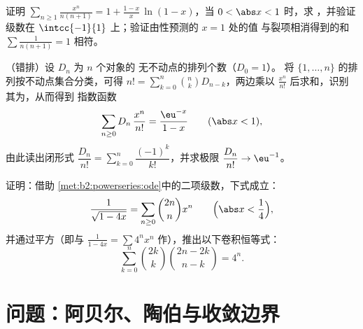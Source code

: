 \begin{exercise}[$\star$]\label{exo:b2:powerseries:10}
证明 $\displaystyle\sum_{n\geq1}\frac{x^n}{n(n+1)} = 1 +
\frac{1-x}{x}\,\ln(1-x)$，当 $0 < \abs x < 1$ 时，求
，并验证级数在
$\intcc{-1}{1}$ 上；验证由性预测的 $x = 1$ 处的值
与裂项相消得到的和 $\sum
\frac{1}{n(n+1)} = 1$ 相符。
\end{exercise}

\begin{exercise}[$\star\star$]\label{exo:b2:powerseries:11}
（错排）设 $D_n$ 为 $n$ 个对象的
无不动点的排列个数（$D_0 = 1$）。
将 $\{1, \dots, n\}$ 的排列按不动点集合分类，可得
$n! = \sum_{k=0}^{n}\binom nk D_{n-k}$，两边乘以
$\frac{x^n}{n!}$ 后求和，识别其为，从而得到
指数函数
\[
\sum_{n\geq0} D_n\,\frac{x^n}{n!} = \frac{\eu^{-x}}{1-x}
\qquad (\abs x < 1),
\]
由此读出闭形式 $\dfrac{D_n}{n!} =
\sum_{k=0}^{n}\dfrac{(-1)^k}{k!}$，并求极限 $\dfrac{D_n}{n!}
\to \eu^{-1}$。
\end{exercise}

\begin{exercise}[$\star\star\star$]\label{exo:b2:powerseries:12}
证明：借助
\cref{met:b2:powerseries:ode}中的二项级数，下式成立：
\[
\frac{1}{\sqrt{1 - 4x}} = \sum_{n\geq0}\binom{2n}{n}x^n
\qquad \Bigl(\abs x < \frac14\Bigr),
\]
并通过平方（即与
$\frac{1}{1-4x} = \sum 4^nx^n$ 作），推出以下卷积恒等式：
\[
\sum_{k=0}^{n}\binom{2k}{k}\binom{2n-2k}{n-k} = 4^n .
\]
\end{exercise}

\section{问题：阿贝尔、陶伯与收敛边界}

